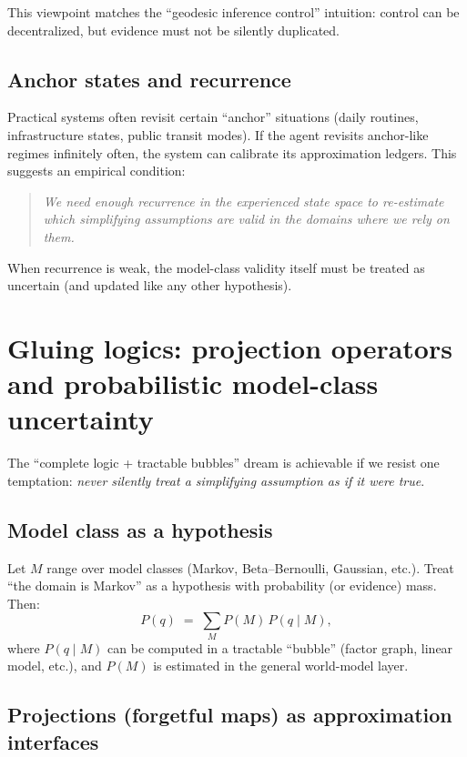 \documentclass[11pt]{article}
\begin{document}
This viewpoint matches the ``geodesic inference control'' intuition:
control can be decentralized, but evidence must not be silently duplicated.

\subsection{Anchor states and recurrence}

Practical systems often revisit certain ``anchor'' situations (daily routines, infrastructure states,
public transit modes). If the agent revisits anchor-like regimes infinitely often, the system can
calibrate its approximation ledgers. This suggests an empirical condition:

\begin{quote}
\emph{We need enough recurrence in the experienced state space to re-estimate which simplifying
assumptions are valid in the domains where we rely on them.}
\end{quote}

When recurrence is weak, the model-class validity itself must be treated as uncertain
(and updated like any other hypothesis).

\section{Gluing logics: projection operators and probabilistic model-class uncertainty}

The ``complete logic + tractable bubbles'' dream is achievable if we resist one temptation:
\emph{never silently treat a simplifying assumption as if it were true}.

\subsection{Model class as a hypothesis}

Let $M$ range over model classes (Markov, Beta--Bernoulli, Gaussian, etc.).
Treat ``the domain is Markov'' as a hypothesis with probability (or evidence) mass.
Then:
\[
  P(q) \;=\; \sum_M P(M)\, P(q \mid M),
\]
where $P(q\mid M)$ can be computed in a tractable ``bubble'' (factor graph, linear model, etc.),
and $P(M)$ is estimated in the general world-model layer.

\subsection{Projections (forgetful maps) as approximation interfaces}
\end{document}
